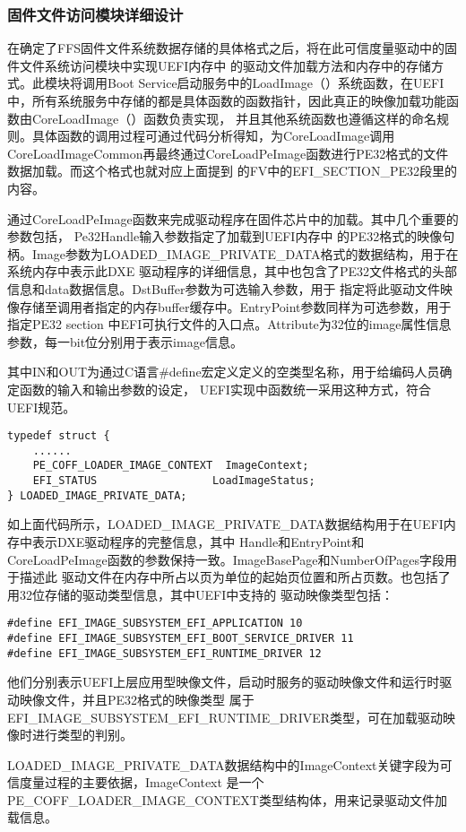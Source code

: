 \subsubsection{固件文件访问模块详细设计}
在确定了FFS固件文件系统数据存储的具体格式之后，将在此可信度量驱动中的固件文件系统访问模块中实现UEFI内存中
的驱动文件加载方法和内存中的存储方式。此模块将调用Boot Service启动服务中的LoadImage（）系统函数，在UEFI
中，所有系统服务中存储的都是具体函数的函数指针，因此真正的映像加载功能函数由CoreLoadImage（）函数负责实现，
并且其他系统函数也遵循这样的命名规则。具体函数的调用过程可通过代码分析得知，为CoreLoadImage调用
CoreLoadImageCommon再最终通过CoreLoadPeImage函数进行PE32格式的文件数据加载。而这个格式也就对应上面提到
的FV中的EFI\_SECTION\_PE32段里的内容。
\par 通过CoreLoadPeImage函数来完成驱动程序在固件芯片中的加载。其中几个重要的参数包括，
Pe32Handle输入参数指定了加载到UEFI内存中
的PE32格式的映像句柄。Image参数为LOADED\_IMAGE\_PRIVATE\_DATA格式的数据结构，用于在系统内存中表示此DXE
驱动程序的详细信息，其中也包含了PE32文件格式的头部信息和data数据信息。DstBuffer参数为可选输入参数，用于
指定将此驱动文件映像存储至调用者指定的内存buffer缓存中。EntryPoint参数同样为可选参数，用于指定PE32 section
中EFI可执行文件的入口点。Attribute为32位的image属性信息参数，每一bit位分别用于表示image信息。
\par 其中IN和OUT为通过C语言\#define宏定义定义的空类型名称，用于给编码人员确定函数的输入和输出参数的设定，
UEFI实现中函数统一采用这种方式，符合UEFI规范。

\begin{lstlisting}
typedef struct {
    ......
    PE_COFF_LOADER_IMAGE_CONTEXT  ImageContext; 
    EFI_STATUS                  LoadImageStatus;
} LOADED_IMAGE_PRIVATE_DATA;
\end{lstlisting}

如上面代码所示，LOADED\_IMAGE\_PRIVATE\_DATA数据结构用于在UEFI内存中表示DXE驱动程序的完整信息，其中
Handle和EntryPoint和CoreLoadPeImage函数的参数保持一致。ImageBasePage和NumberOfPages字段用于描述此
驱动文件在内存中所占以页为单位的起始页位置和所占页数。也包括了用32位存储的驱动类型信息，其中UEFI中支持的
驱动映像类型包括：

\begin{lstlisting}
#define EFI_IMAGE_SUBSYSTEM_EFI_APPLICATION 10
#define EFI_IMAGE_SUBSYSTEM_EFI_BOOT_SERVICE_DRIVER 11
#define EFI_IMAGE_SUBSYSTEM_EFI_RUNTIME_DRIVER 12
\end{lstlisting}

他们分别表示UEFI上层应用型映像文件，启动时服务的驱动映像文件和运行时驱动映像文件，并且PE32格式的映像类型
属于EFI\_IMAGE\_SUBSYSTEM\_EFI\_RUNTIME\_DRIVER类型，可在加载驱动映像时进行类型的判别。
\par LOADED\_IMAGE\_PRIVATE\_DATA数据结构中的ImageContext关键字段为可信度量过程的主要依据，ImageContext
是一个PE\_COFF\_LOADER\_IMAGE\_CONTEXT类型结构体，用来记录驱动文件加载信息。

